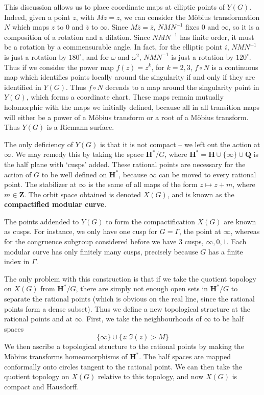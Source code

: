 This discussion allows us to place coordinate maps at elliptic points of $Y(G)$. Indeed, given a point $z$, with $Mz = z$, we can consider the M\"{o}bius transformation $N$ which maps $z$ to 0 and $\overline{z}$ to $\infty$. Since $M\overline{z} = \overline{z}$, $NMN^{-1}$ fixes 0 and $\infty$, so it is a composition of a rotation and a dilation. Since $NMN^{-1}$ has finite order, it must be a rotation by a commensurable angle. In fact, for the elliptic point $i$, $NMN^{-1}$ is just a rotation by $180^\circ$, and for $\omega$ and $\omega^2$, $NMN^{-1}$ is just a rotation by $120^\circ$. Thus if we consider the power map $f(z) = z^k$, for $k = 2,3$, $f \circ N$ is a continuous map which identifies points locally around the singularity if and only if they are identified in $Y(G)$. Thus $f \circ N$ decends to a map around the singularity point in $Y(G)$, which forms a coordinate chart. These maps remain mutually holomorphic with the maps we initially defined, because all in all transition maps will either be a power of a M\"{o}bius transform or a root of a M\"{o}bius transform. Thus $Y(G)$ is a Riemann surface.

The only deficiency of $Y(G)$ is that it is not compact -- we left out the action at $\infty$. We may remedy this by taking the space $\mathbf{H}^*/G$, where $\mathbf{H}^* = \mathbf{H} \cup \{ \infty \} \cup \mathbf{Q}$ is the half plane with `cusps' added. These rational points are necessary for the action of $G$ to be well defined on $\mathbf{H}^*$, because $\infty$ can be moved to every rational point. The stabilizer at $\infty$ is the same of all maps of the form $z \mapsto z + m$, where $m \in \mathbf{Z}$. The orbit space obtained is denoted $X(G)$, and is known as the {\bf compactified modular curve}.

The points addended to $Y(G)$ to form the compactification $X(G)$ are known as cusps. For instance, we only have one cusp for $G = \Gamma$, the point at $\infty$, whereas for the congruence subgroup considered before we have 3 cusps, $\infty, 0, 1$. Each modular curve has only finitely many cusps, precisely because $G$ has a finite index in $\Gamma$.

The only problem with this construction is that if we take the quotient topology on $X(G)$ from $\mathbf{H}^*/G$, there are simply not enough open sets in $\mathbf{H}^*/G$ to separate the rational points (which is obvious on the real line, since the rational points form a dense subset). Thus we define a new topological structure at the rational points and at $\infty$. First, we take the neighbourhoods of $\infty$ to be half spaces
%
\[ \{ \infty \} \cup \{ z : \Im(z) > M \} \]
%
We then ascribe a topological structure to the rational points by making the M\"{o}bius transforms homeomorphisms of $\mathbf{H}^*$. The half spaces are mapped conformally onto circles tangent to the rational point. We can then take the quotient topology on $X(G)$ relative to this topology, and now $X(G)$ is compact and Hausdorff.

